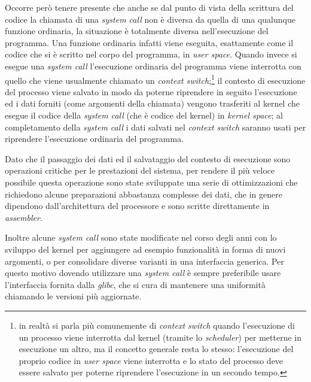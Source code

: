 Occorre però tenere presente che anche se dal punto di vista della scrittura
del codice la chiamata di una \textit{system call} non è diversa da quella di
una qualunque funzione ordinaria, la situazione è totalmente diversa
nell'esecuzione del programma. Una funzione ordinaria infatti viene eseguita,
esattamente come il codice che si è scritto nel corpo del programma, in
\textit{user space}. Quando invece si esegue una \textit{system call}
l'esecuzione ordinaria del programma viene interrotta con quello che viene
usualmente chiamato un  \textit{context
  switch};\footnote{in realtà si parla più comunemente di \textit{context
    switch} quando l'esecuzione di un processo viene interrotta dal kernel
  (tramite lo \textit{scheduler}) per metterne in esecuzione un altro, ma il
  concetto generale resta lo stesso: l'esecuzione del proprio codice in
  \textit{user space} viene interrotta e lo stato del processo deve essere
  salvato per poterne riprendere l'esecuzione in un secondo tempo.}  il
contesto di esecuzione del processo viene salvato in modo da poterne
riprendere in seguito l'esecuzione ed i dati forniti (come argomenti della
chiamata) vengono trasferiti al kernel che esegue il codice della
\textit{system call} (che è codice del kernel) in \textit{kernel space}; al
completamento della \textit{system call} i dati salvati nel \textit{context
  switch} saranno usati per riprendere l'esecuzione ordinaria del programma.

Dato che il passaggio dei dati ed il salvataggio del contesto di esecuzione
sono operazioni critiche per le prestazioni del sistema, per rendere il più
veloce possibile questa operazione sono state sviluppate una serie di
ottimizzazioni che richiedono alcune preparazioni abbastanza complesse dei
dati, che in genere dipendono dall'architettura del processore e sono scritte
direttamente in \textit{assembler}.


%
%

Inoltre alcune \textit{system call} sono state modificate nel corso degli anni
con lo sviluppo del kernel per aggiungere ad esempio funzionalità in forma di
nuovi argomenti, o per consolidare diverse varianti in una interfaccia
generica.  Per questo motivo dovendo utilizzare una \textit{system call} è
sempre preferibile usare l'interfaccia fornita dalla \textsl{glibc}, che si
cura di mantenere una uniformità chiamando le versioni più aggiornate.

